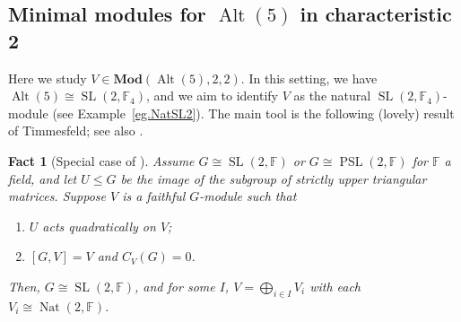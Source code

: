 \documentclass[a4paper, 11pt]{amsart}
\theoremstyle{plain}
\newtheorem{fact}[theorem]{Fact}
\theoremstyle{definition}
\theoremstyle{remark}
\DeclareMathOperator{\Alt}{Alt}
\DeclareMathOperator{\PSL}{PSL}
\DeclareMathOperator{\SL}{SL}
\DeclareMathOperator{\Nat}{Nat}
\newcommand{\Mod}{\mathbf{Mod}}
\newcommand{\bF}{\mathbb{F}}
\begin{document}
\subsection{Minimal modules for \texorpdfstring{$\Alt(5)$}{Alt(5)} in characteristic 2}

Here we study $V\in \Mod(\Alt(5),2,2)$. In this setting, we have $\Alt(5)\cong \SL(2,\bF_4)$, and we aim to identify $V$ as the natural $\SL(2,\bF_4)$-module (see Example~\ref{eg.NatSL2}). The main tool is the following (lovely) result of Timmesfeld; see also \cite{SmS89}.

\begin{fact}[Special case of {\cite[(3.7)~Corollary]{TiF01}}]\label{fact.Nat(SL2)}
Assume $G\cong \SL(2,\bF)$ or $G\cong \PSL(2,\bF)$ for $\bF$ a field, and let $U\le G$ be the image of the subgroup of strictly upper triangular matrices. Suppose  $V$ is a faithful $G$-module such that
\begin{enumerate}
    \item $U$ acts quadratically on $V$;
    \item $[G,V] = V$ and $C_V(G) = 0$.
\end{enumerate}
Then, $G\cong \SL(2,\bF)$, and for some  $I$, $V= \bigoplus_{i\in I} V_i$ with each $V_i \cong \Nat(2,\bF)$.
\end{fact}
\end{document}
